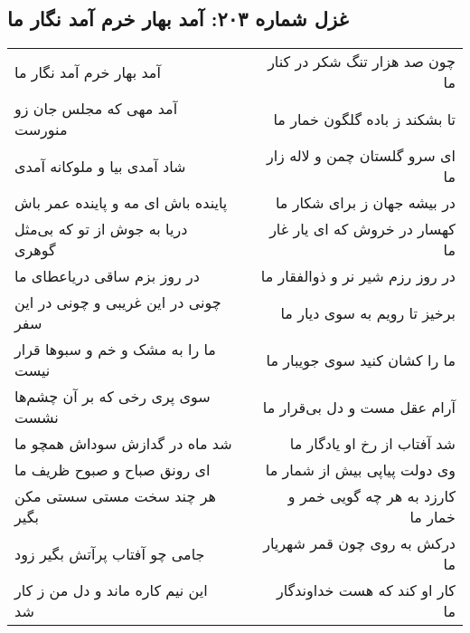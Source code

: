 \begin{center}
\section*{غزل شماره ۲۰۳: آمد بهار خرم آمد نگار ما}
\label{sec:0203}
\begin{longtable}{l p{0.5cm} r}
آمد بهار خرم آمد نگار ما
&&
چون صد هزار تنگ شکر در کنار ما
\\
آمد مهی که مجلس جان زو منورست
&&
تا بشکند ز باده گلگون خمار ما
\\
شاد آمدی بیا و ملوکانه آمدی
&&
ای سرو گلستان چمن و لاله زار ما
\\
پاینده باش ای مه و پاینده عمر باش
&&
در بیشه جهان ز برای شکار ما
\\
دریا به جوش از تو که بی‌مثل گوهری
&&
کهسار در خروش که ای یار غار ما
\\
در روز بزم ساقی دریاعطای ما
&&
در روز رزم شیر نر و ذوالفقار ما
\\
چونی در این غریبی و چونی در این سفر
&&
برخیز تا رویم به سوی دیار ما
\\
ما را به مشک و خم و سبوها قرار نیست
&&
ما را کشان کنید سوی جویبار ما
\\
سوی پری رخی که بر آن چشم‌ها نشست
&&
آرام عقل مست و دل بی‌قرار ما
\\
شد ماه در گدازش سوداش همچو ما
&&
شد آفتاب از رخ او یادگار ما
\\
ای رونق صباح و صبوح ظریف ما
&&
وی دولت پیاپی بیش از شمار ما
\\
هر چند سخت مستی سستی مکن بگیر
&&
کارزد به هر چه گویی خمر و خمار ما
\\
جامی چو آفتاب پرآتش بگیر زود
&&
درکش به روی چون قمر شهریار ما
\\
این نیم کاره ماند و دل من ز کار شد
&&
کار او کند که هست خداوندگار ما
\\
\end{longtable}
\end{center}
